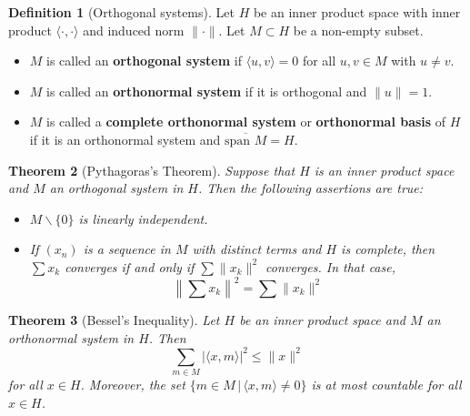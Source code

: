 \documentclass[10pt, oneside, reqno]{amsart}
\theoremstyle{plain}%
\newtheorem{thm}{Theorem}[section]
\theoremstyle{definition}
\newtheorem{defn}[thm]{Definition}
\theoremstyle{remark}
\newcommand{\iprod}[2]{\langle #1, #2 \rangle}
\newcommand{\ol}[1]{\overline{#1}}
\begin{document}
\begin{defn}[Orthogonal systems]  
    Let $H$ be an inner product space with inner product $\iprod{\cdot}{\cdot}$ and induced norm $\| \cdot \|$.  Let $M \subset H$ be a non-empty subset.
    \begin{itemize}
        \item $M$ is called an \textbf{orthogonal system} if $\iprod{u}{v} = 0$ for all $u,v \in M$ with $u \neq v$.
        \item $M$ is called an \textbf{orthonormal system} if it is orthogonal and $\| u \| = 1$.
        \item $M$ is called a \textbf{complete orthonormal system} or \textbf{orthonormal basis} of $H$ if it is an orthonormal system and $\ol{\text{span $M$}} = H$.
    \end{itemize}

\end{defn}

\begin{thm}[Pythagoras's Theorem]
    Suppose that $H$ is an inner product space and $M$ an orthogonal system in $H$.  Then the following assertions are true:
    \begin{itemize}
        \item $M \backslash \{0\}$ is linearly independent.
        \item If $(x_n)$ is a sequence in $M$ with distinct terms and $H$ is complete, then $\sum x_k$ converges if and only if $\sum \| x_k \|^2$ converges.  In that case, \[
            \left\| \sum x_k \right\|^2 = \sum \|x_k \|^2
        \]
    \end{itemize}
\end{thm}

\begin{thm}[Bessel's Inequality]
    Let $H$ be an inner product space and $M$ an orthonormal system in $H$.  Then \[
        \sum_{m \in M} | \iprod{x}{m}|^2 \leq \| x \|^2
    \]
    for all $x \in H$.  Moreover, the set $\{ m \in M \, | \, \iprod{x}{m} \neq 0 \}$ is at most countable for all $x \in H$.
\end{thm}

\end{document}
